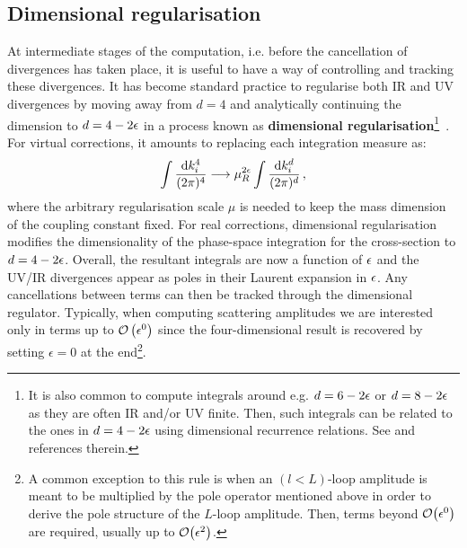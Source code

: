 \documentclass[main.tex]{subfiles}
\begin{document}
\subsection{Dimensional regularisation} \label{sec:dimreg}
At intermediate stages of the computation, i.e. before the cancellation of divergences has taken place, it is useful to have a way of controlling and tracking these divergences. It has become standard practice to regularise both IR and UV divergences by moving away from $d=4$ and analytically continuing the dimension to $d=4-2\epsilon$ in a process known as \textbf{dimensional regularisation}\footnote{It is also common to compute integrals around e.g. $d=6-2\epsilon$ or $d=8-2\epsilon$ as they are often IR and/or UV finite. Then, such integrals can be related to the ones in $d=4-2\epsilon$ using dimensional recurrence relations. See \cite{Bern:1993kr, Lee:2012cn} and references therein.}~\cite{bollini1964analytic, THOOFT1972189}. For virtual corrections, it amounts to replacing each integration measure as:
\begin{equation}
    \int \frac{\mathrm{d} k_i^{4}}{(2\pi)^4} \longrightarrow \mu_R^{2\epsilon} \int \frac{\mathrm{d} k_i^{d}}{(2\pi)^d}\,,
\end{equation}
where the arbitrary regularisation scale $\mu$ is needed to keep the mass dimension of the coupling constant fixed. For real corrections, dimensional regularisation modifies the dimensionality of the phase-space integration for the cross-section to $d=4-2\epsilon$. Overall, the resultant integrals are now a function of $\epsilon$ and the UV/IR divergences appear as poles in their Laurent expansion in $\epsilon$. Any cancellations between terms can then be tracked through the dimensional regulator. Typically, when computing scattering amplitudes we are interested only in terms up to $\mathcal{O}\left(\epsilon^0\right)$ since the four-dimensional result is recovered by setting $\epsilon = 0$ at the end\footnote{A common exception to this rule is when an $(l<L)$-loop amplitude is meant to be multiplied by the pole operator mentioned above in order to derive the pole structure of the $L$-loop amplitude. Then, terms beyond $\mathcal{O}\big(\epsilon^0\big)$ are required, usually up to $\mathcal{O}\big(\epsilon^2\big)$.}.
\end{document}
